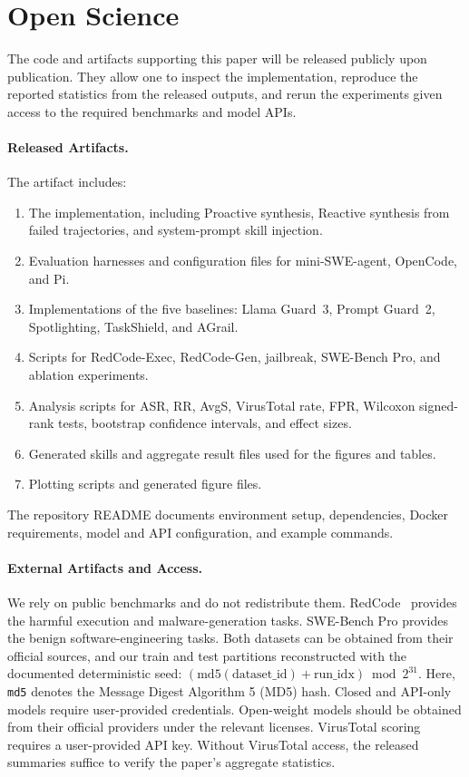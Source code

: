 \section*{Open Science}
\label{app:openscience}

The code and artifacts supporting this paper will be released publicly upon publication. They allow one to inspect the implementation, reproduce the reported statistics from the released outputs, and rerun the experiments given access to the required benchmarks and model APIs.

\paragraph{Released Artifacts.}
The artifact includes:
\begin{enumerate}[label=(\arabic*),leftmargin=*,topsep=2pt,itemsep=1pt,parsep=0pt]
  \item The \sysname implementation, including Proactive synthesis, Reactive synthesis from failed trajectories, and system-prompt skill injection.
  \item Evaluation harnesses and configuration files for mini-SWE-agent, OpenCode, and Pi.
  \item Implementations of the five baselines: Llama Guard~3, Prompt Guard~2, Spotlighting, TaskShield, and AGrail.
  \item Scripts for RedCode-Exec, RedCode-Gen, jailbreak, SWE-Bench Pro, and ablation experiments.
  \item Analysis scripts for ASR, RR, AvgS, VirusTotal rate, FPR, Wilcoxon signed-rank tests, bootstrap confidence intervals, and effect sizes.
  \item Generated skills and aggregate result files used for the figures and tables.
  \item Plotting scripts and generated figure files.
\end{enumerate}
The repository README documents environment setup, dependencies, Docker requirements, model and API configuration, and example commands.

\paragraph{External Artifacts and Access.}
We rely on public benchmarks and do not redistribute them. RedCode~\cite{guo2024redcode} provides the harmful execution and malware-generation tasks. SWE-Bench Pro provides the benign software-engineering tasks. Both datasets can be obtained from their official sources, and our train and test partitions reconstructed with the documented deterministic seed:
$(\text{md5}(\text{dataset\_id}) + \text{run\_idx}) \bmod 2^{31}$.
Here, \texttt{md5} denotes the Message Digest Algorithm 5 (MD5) hash. Closed and API-only models require user-provided credentials. Open-weight models should be obtained from their official providers under the relevant licenses. VirusTotal scoring requires a user-provided API key. Without VirusTotal access, the released summaries suffice to verify the paper's aggregate statistics.

